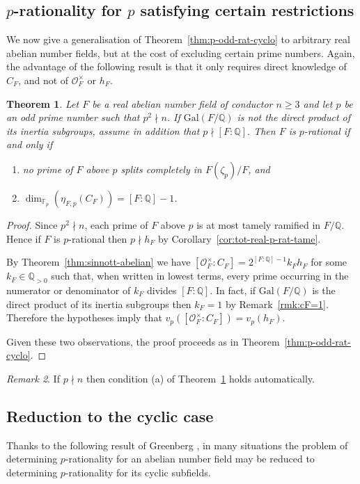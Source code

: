 \documentclass[12pt, a4paper, usenames]{amsart}
\newcommand{\Q}{\mathbb{Q}}
\newcommand{\F}{\mathbb{F}}
\theoremstyle{plain}
\newtheorem{theorem}{Theorem}[section]
\theoremstyle{remark}
\newtheorem{remark}[theorem]{Remark}
\theoremstyle{definition}
\newcommand{\Gal}{\mathrm{Gal}}
\begin{document}
\subsection{$p$-rationality for $p$ satisfying certain restrictions}
We now give a generalisation of Theorem~\ref{thm:p-odd-rat-cyclo} to 
arbitrary real abelian number fields, but at the cost of excluding certain prime numbers. 
Again, the advantage of the following result is that it only requires direct knowledge
of $C_{F}$, and not of $\mathcal{O}_{F}^{\times}$ or $h_{F}$.

\begin{theorem}\label{thm:real-abelian-p-rat}
Let $F$ be a real abelian number field of conductor $n \geq 3$ and
let $p$ be an odd prime number such that $p^{2} \nmid n$.
If $\Gal(F/\Q)$ is not the direct product of its inertia subgroups,
assume in addition that $p \nmid [F:\Q]$.
Then $F$ is $p$-rational if and only if 
\begin{enumerate}
    \item no prime of $F$ above $p$ splits completely in $F(\zeta_{p})/F$, and 
    \item $\dim_{\F_{p}}(\eta_{F,p}(C_{F}))=[F:\Q]-1$.
\end{enumerate}
\end{theorem}

\begin{proof}
Since $p^{2} \nmid n$, each prime of $F$ above $p$ is at most tamely ramified in $F/\Q$.
Hence if $F$ is $p$-rational then $p \nmid h_{F}$ by Corollary~\ref{cor:tot-real-p-rat-tame}.

By Theorem~\ref{thm:sinnott-abelian} we have 
$[\mathcal{O}_{F}^{\times} : C_{F}] = 2^{[F:\Q]-1} k_{F}h_{F}$ for some 
$k_{F} \in \Q_{>0}$ such that, when written in lowest terms, every prime occurring 
in the numerator or denominator of $k_{F}$ divides $[F:\Q]$.
In fact, if $\Gal(F/\Q)$ is the direct product of its inertia subgroups
then $k_{F}=1$ by Remark~\ref{rmk:cF=1}. Therefore the hypotheses imply that 
$v_{p}([\mathcal{O}_{F}^{\times} : C_{F}])=v_{p}(h_{F})$.

Given these two observations, the proof proceeds as in Theorem~\ref{thm:p-odd-rat-cyclo}.
\end{proof}

\begin{remark}
If $p \nmid n$ then condition (a) of Theorem~\ref{thm:real-abelian-p-rat} holds automatically.
\end{remark}

\subsection{Reduction to the cyclic case}
Thanks to the following result of Greenberg \cite[Proposition~3.6]{MR3512524}, 
in many situations the problem of determining $p$-rationality for an abelian number field 
may be reduced to determining $p$-rationality for its cyclic subfields.
\end{document}
